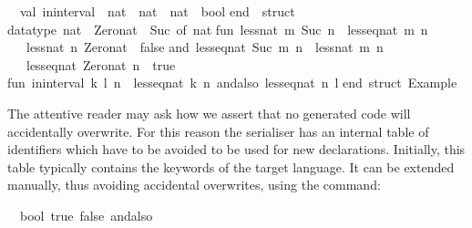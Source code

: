 \begin{isabellebody}
\begin{isamarkuptext}
\ \ val\ in{\isacharunderscore}interval\ {\isacharcolon}\ nat\ {\isacharasterisk}\ nat\ {\isacharminus}{\isachargreater}\ nat\ {\isacharminus}{\isachargreater}\ bool\isanewline
end\ {\isacharequal}\ struct\isanewline
\isanewline
datatype\ nat\ {\isacharequal}\ Zero{\isacharunderscore}nat\ {\isacharbar}\ Suc\ of\ nat{\isacharsemicolon}\isanewline
\isanewline
fun\ less{\isacharunderscore}nat\ m\ {\isacharparenleft}Suc\ n{\isacharparenright}\ {\isacharequal}\ less{\isacharunderscore}eq{\isacharunderscore}nat\ m\ n\isanewline
\ \ {\isacharbar}\ less{\isacharunderscore}nat\ n\ Zero{\isacharunderscore}nat\ {\isacharequal}\ false\isanewline
and\ less{\isacharunderscore}eq{\isacharunderscore}nat\ {\isacharparenleft}Suc\ m{\isacharparenright}\ n\ {\isacharequal}\ less{\isacharunderscore}nat\ m\ n\isanewline
\ \ {\isacharbar}\ less{\isacharunderscore}eq{\isacharunderscore}nat\ Zero{\isacharunderscore}nat\ n\ {\isacharequal}\ true{\isacharsemicolon}\isanewline
\isanewline
fun\ in{\isacharunderscore}interval\ {\isacharparenleft}k{\isacharcomma}\ l{\isacharparenright}\ n\ {\isacharequal}\ less{\isacharunderscore}eq{\isacharunderscore}nat\ k\ n\ andalso\ less{\isacharunderscore}eq{\isacharunderscore}nat\ n\ l{\isacharsemicolon}\isanewline
\isanewline
end{\isacharsemicolon}\ {\isacharparenleft}{\isacharasterisk}struct\ Example{\isacharasterisk}{\isacharparenright}\isanewline%
\end{isamarkuptext}%
\isamarkuptrue%
%
\endisatagquotetypewriter
{\isafoldquotetypewriter}%
%
\isadelimquotetypewriter
%
\endisadelimquotetypewriter
%
\begin{isamarkuptext}%
\noindent The attentive reader may ask how we assert that no
  generated code will accidentally overwrite.  For this reason the
  serialiser has an internal table of identifiers which have to be
  avoided to be used for new declarations.  Initially, this table
  typically contains the keywords of the target language.  It can be
  extended manually, thus avoiding accidental overwrites, using the
  \hypertarget{command.code-reserved}{\hyperlink{command.code-reserved}{\mbox{}}} command:%
\end{isamarkuptext}%
\isamarkuptrue%
%
\isadelimquote
%
\endisadelimquote
%
\isatagquote
{}\isamarkupfalse%
\ {\isachardoublequoteopen}{\isasymSMLdummy}{\isachardoublequoteclose}\ bool\ true\ false\ andalso%
\endisatagquote
{\isafoldquote}%
%
\isadelimquote
%
\endisadelimquote
%
\begin{isamarkuptext}%

\end{isamarkuptext}
\end{isabellebody}
